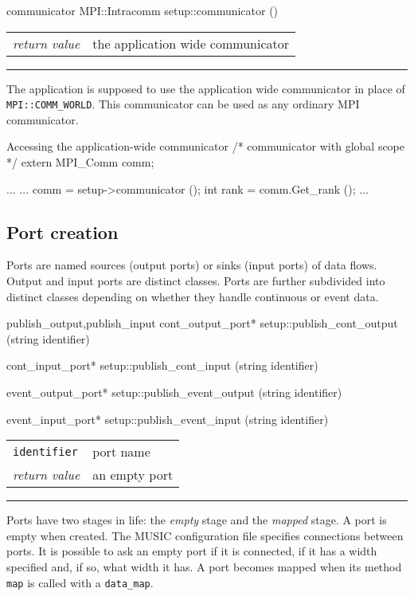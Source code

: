 \documentclass[a4paper]{report}
\makeatletter
\newenvironment{parameters}%
{\begin{tabular}{@{\hspace{2em}}lp{0.6\textwidth}}}%
{\end{tabular}\par\vspace{1mm}\par\hrule\par\vspace{5mm}}
\makeatother
\begin{document}
\begin{head}{communicator}
  MPI::Intracomm setup::communicator ()
\end{head}
\begin{parameters}
  \emph{return value} & the application wide communicator \\
\end{parameters}

The application is supposed to use the application wide communicator
in place of
\lstinline|MPI::COMM_WORLD|.
This communicator can be used as any ordinary MPI communicator.

\begin{code}{Accessing the application-wide communicator}
/* communicator with global scope */
extern MPI_Comm comm;

...
{
  ...
  comm = setup->communicator ();
  int rank = comm.Get_rank ();
  ...
}
\end{code}

\subsection{Port creation}

Ports are named sources (output ports) or sinks (input
ports) of data flows.  Output and input ports are distinct classes.
Ports are further subdivided into distinct classes depending on
whether they handle continuous or event data.

\begin{head}{publish_output,publish_input}
  cont_output_port* setup::publish_cont_output (string identifier)

  cont_input_port* setup::publish_cont_input (string identifier)

  event_output_port* setup::publish_event_output (string identifier)

  event_input_port* setup::publish_event_input (string identifier)
\end{head}
\begin{parameters}
  \lstinline|identifier| & port name \\
  \emph{return value} & an empty port \\
\end{parameters}

Ports have two stages in life: the \emph{empty} stage and the
\emph{mapped} stage.  A port is empty when created.  The MUSIC
configuration file specifies connections between ports.  It is
possible to ask an empty port if it is connected, if it has a width
specified and, if so, what width it has.  A port becomes mapped when
its method \lstinline|map| is called with a \lstinline|data_map|.
\end{document}
